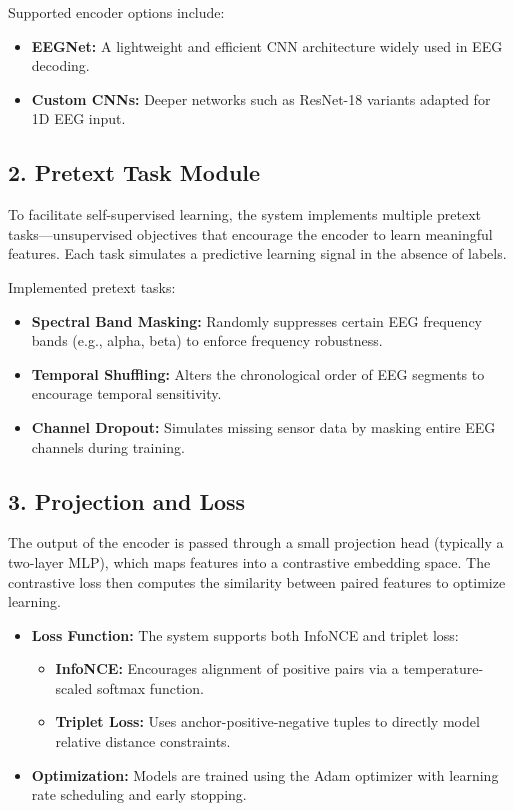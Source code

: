 Supported encoder options include:
\begin{itemize}
    \item \textbf{EEGNet:} A lightweight and efficient CNN architecture widely used in EEG decoding.
    \item \textbf{Custom CNNs:} Deeper networks such as ResNet-18 variants adapted for 1D EEG input.
\end{itemize}

\subsection*{2. Pretext Task Module}

To facilitate self-supervised learning, the system implements multiple pretext tasks—unsupervised objectives that encourage the encoder to learn meaningful features. Each task simulates a predictive learning signal in the absence of labels.

Implemented pretext tasks:
\begin{itemize}
    \item \textbf{Spectral Band Masking:} Randomly suppresses certain EEG frequency bands (e.g., alpha, beta) to enforce frequency robustness.
    \item \textbf{Temporal Shuffling:} Alters the chronological order of EEG segments to encourage temporal sensitivity.
    \item \textbf{Channel Dropout:} Simulates missing sensor data by masking entire EEG channels during training.
\end{itemize}

\subsection*{3. Projection and Loss}

The output of the encoder is passed through a small projection head (typically a two-layer MLP), which maps features into a contrastive embedding space. The contrastive loss then computes the similarity between paired features to optimize learning.

\begin{itemize}
    \item \textbf{Loss Function:} The system supports both InfoNCE and triplet loss:
    \begin{itemize}
        \item \textbf{InfoNCE:} Encourages alignment of positive pairs via a temperature-scaled softmax function.
        \item \textbf{Triplet Loss:} Uses anchor-positive-negative tuples to directly model relative distance constraints.
    \end{itemize}
    \item \textbf{Optimization:} Models are trained using the Adam optimizer with learning rate scheduling and early stopping.
\end{itemize}

